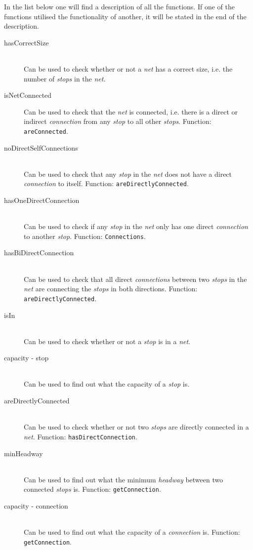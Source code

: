 \documentclass[a4]{article}
\begin{document}
\noindent In the list below one will find a description of all the functions. If one of the functions utilised the functionality of another, it will be stated in the end of the description. \\

\begin{description}
    \item[hasCorrectSize] \hfill \\ Can be used to check whether or not a \emph{net} has a correct size, i.e. the number of \emph{stops} in the \emph{net}.
    \item[isNetConnected] Can be used to check that the \emph{net} is connected, i.e. there is a direct or indirect \emph{connection} from any \emph{stop} to all other \emph{stops}. Function: \verb=areConnected=.
    \item[noDirectSelfConnections] \hfill \\ Can be used to check that any \emph{stop} in the \emph{net} does not have a direct \emph{connection} to itself. Function: \verb=areDirectlyConnected=.
    \item[hasOneDirectConnection] \hfill \\ Can be used to check if any \emph{stop} in the \emph{net} only has one direct \emph{connection} to another \emph{stop}. Function:  \verb=Connections=.
    \item[hasBiDirectConnection] \hfill \\ Can be used to check that all direct \emph{connections} between two \emph{stops} in the \emph{net} are connecting the \emph{stops} in both directions. Function: \verb=areDirectlyConnected=.
    \item[isIn] \hfill \\ Can be used to check whether or not a \emph{stop} is in a \emph{net}.
    \item[capacity - stop] \hfill \\ Can be used to find out what the capacity of a \emph{stop} is.
    \item[areDirectlyConnected] \hfill \\ Can be used to check whether or not two \emph{stops} are directly connected in a \emph{net}. Function: \verb=hasDirectConnection=.
    \item[minHeadway] \hfill \\ Can be used to find out what the minimum \emph{headway} between two connected \emph{stops} is. Function: \verb=getConnection=.
    \item[capacity - connection] \hfill \\ Can be used to find out what the capacity of a \emph{connection} is. Function: \verb=getConnection=.

\end{description}
\end{document}
